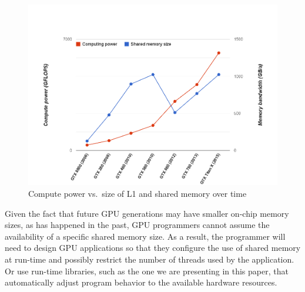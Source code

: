 \begin{figure}
\includegraphics[width=\linewidth]{computevsshared.png}
\caption{Compute power vs.\ size of L1 and shared memory over time}
\label{fig:memsize}
\end{figure}

Given the fact that future GPU generations may have smaller on-chip memory sizes, as has happened in the past, GPU programmers cannot assume the availability of a specific shared memory size.
As a result, the programmer will need to design GPU applications so that they configure the use of shared memory at run-time and possibly restrict the number of threads used by the application.
Or use run-time libraries, such as the one we are presenting in this paper, that automatically adjust program behavior to the available hardware resources.

